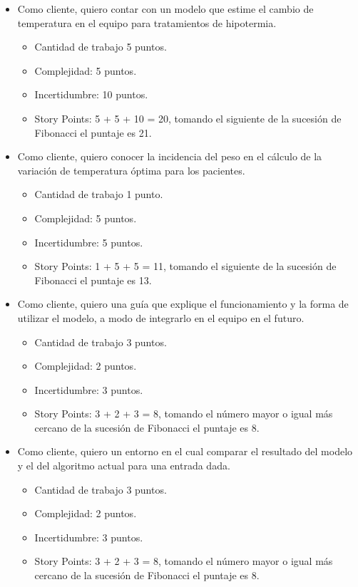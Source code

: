 \documentclass[
11pt, %
]{charter}
\begin{document}
\begin{itemize}
	\item Como cliente, quiero contar con un modelo que estime el cambio de temperatura en el equipo para tratamientos de hipotermia.
		\begin{itemize}
			\item Cantidad de trabajo 5 puntos.
			\item Complejidad: 5 puntos.
			\item Incertidumbre: 10 puntos.
			\item Story Points: 5 + 5 + 10 = 20, tomando el siguiente de la sucesión de Fibonacci el puntaje es 21.
		\end{itemize}
	\item Como cliente, quiero conocer la incidencia del peso en el cálculo de la variación de temperatura óptima para los pacientes.
		\begin{itemize}
			\item Cantidad de trabajo 1 punto.
			\item Complejidad: 5 puntos.
			\item Incertidumbre: 5 puntos.
			\item Story Points: 1 + 5 + 5 = 11, tomando el siguiente de la sucesión de Fibonacci el puntaje es 13.
		\end{itemize}
	\item Como cliente, quiero una guía que explique el funcionamiento y la forma de utilizar el modelo, a modo de integrarlo en el equipo en el futuro.
		\begin{itemize}
			\item Cantidad de trabajo 3 puntos.
			\item Complejidad: 2 puntos.
			\item Incertidumbre: 3 puntos.
			\item Story Points: 3 + 2 + 3 = 8, tomando el número mayor o igual más cercano de la sucesión de Fibonacci el puntaje es 8.
		\end{itemize}
	\item Como cliente, quiero un entorno en el cual comparar el resultado del modelo y el del algoritmo actual para una entrada dada.
	\begin{itemize}
		\item Cantidad de trabajo 3 puntos.
		\item Complejidad: 2 puntos.
		\item Incertidumbre: 3 puntos.
		\item Story Points: 3 + 2 + 3 = 8, tomando el número mayor o igual más cercano de la sucesión de Fibonacci el puntaje es 8.
	\end{itemize}
\end{itemize}
\end{document}
